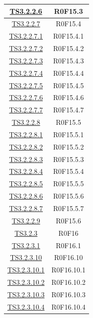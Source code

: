 \documentclass[../PianoDiQualifica.tex]{subfiles}
\begin{document}
\begin{longtable}{|c|c|}
		\hline
		\hyperlink{TS3.2.2.6}{TS3.2.2.6} & R0F15.3   \\
		\hline
		\hyperlink{TS3.2.2.7}{TS3.2.2.7} & R0F15.4   \\
		\hline
		\hyperlink{TS3.2.2.7.1}{TS3.2.2.7.1} & R0F15.4.1   \\
		\hline
		\hyperlink{TS3.2.2.7.2}{TS3.2.2.7.2} & R0F15.4.2   \\
		\hline
		\hyperlink{TS3.2.2.7.3}{TS3.2.2.7.3} & R0F15.4.3   \\
		\hline
		\hyperlink{TS3.2.2.7.4}{TS3.2.2.7.4} & R0F15.4.4   \\
		\hline
		\hyperlink{TS3.2.2.7.5}{TS3.2.2.7.5} & R0F15.4.5   \\
		\hline
		\hyperlink{TS3.2.2.7.6}{TS3.2.2.7.6} & R0F15.4.6   \\
		\hline
		\hyperlink{TS3.2.2.7.7}{TS3.2.2.7.7} & R0F15.4.7   \\
		\hline
		\hyperlink{TS3.2.2.8}{TS3.2.2.8} & R0F15.5   \\
		\hline
		\hyperlink{TS3.2.2.8.1}{TS3.2.2.8.1} & R0F15.5.1   \\
		\hline
		\hyperlink{TS3.2.2.8.2}{TS3.2.2.8.2} & R0F15.5.2   \\
		\hline
		\hyperlink{TS3.2.2.8.3}{TS3.2.2.8.3} & R0F15.5.3   \\
		\hline
		\hyperlink{TS3.2.2.8.4}{TS3.2.2.8.4} & R0F15.5.4   \\
		\hline
		\hyperlink{TS3.2.2.8.5}{TS3.2.2.8.5} & R0F15.5.5   \\
		\hline
		\hyperlink{TS3.2.2.8.6}{TS3.2.2.8.6} & R0F15.5.6   \\
		\hline
		\hyperlink{TS3.2.2.8.7}{TS3.2.2.8.7} & R0F15.5.7   \\
		\hline
		\hyperlink{TS3.2.2.9}{TS3.2.2.9} & R0F15.6   \\
		\hline
		\hyperlink{TS3.2.3}{TS3.2.3} & R0F16   \\
		\hline
		\hyperlink{TS3.2.3.1}{TS3.2.3.1} & R0F16.1   \\
		\hline
		\hyperlink{TS3.2.3.10}{TS3.2.3.10} & R0F16.10   \\
		\hline
		\hyperlink{TS3.2.3.10.1}{TS3.2.3.10.1} & R0F16.10.1   \\
		\hline
		\hyperlink{TS3.2.3.10.2}{TS3.2.3.10.2} & R0F16.10.2   \\
		\hline
		\hyperlink{TS3.2.3.10.3}{TS3.2.3.10.3} & R0F16.10.3   \\
		\hline
		\hyperlink{TS3.2.3.10.4}{TS3.2.3.10.4} & R0F16.10.4   \\
		\hline

\end{longtable}
\end{document}

